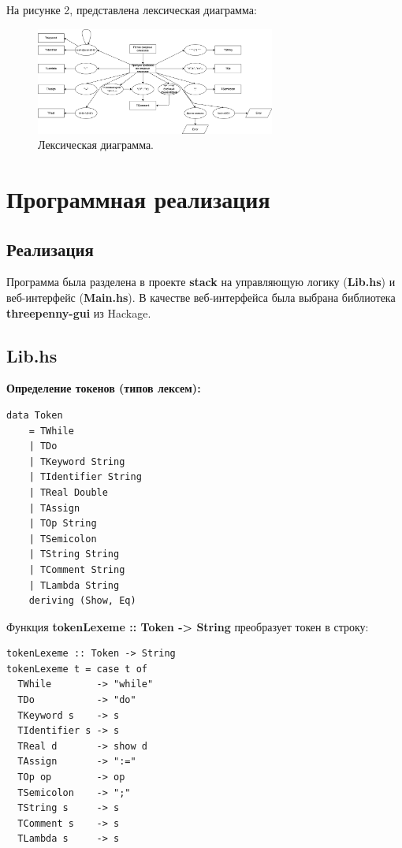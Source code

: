 \documentclass[areasetadvanced]{scrartcl}
\begin{document}
На рисунке 2, представлена лексическая диаграмма:
\begin{figure}[H]
        \centering
        \includegraphics[width=0.7\textwidth]{LexDiagram.png}
        \caption{Лексическая диаграмма.}
        \label{fig:syntdiag}
\end{figure}

\newpage

\section{Программная реализация}
\subsection{Реализация}

Программа была разделена в проекте \textbf{stack} на управляющую логику (\textbf{Lib.hs}) и веб-интерфейс (\textbf{Main.hs}). В качестве веб-интерфейса была выбрана библиотека \textbf{threepenny-gui} из Hackage.

\subsection{Lib.hs}
\textbf{Определение токенов (типов лексем):}
\begin{lstlisting}
data Token
    = TWhile
    | TDo
    | TKeyword String
    | TIdentifier String
    | TReal Double
    | TAssign
    | TOp String
    | TSemicolon
    | TString String
    | TComment String
    | TLambda String
    deriving (Show, Eq)
\end{lstlisting}

Функция \textbf{tokenLexeme :: Token -> String} преобразует токен в строку:
\begin{lstlisting}
tokenLexeme :: Token -> String
tokenLexeme t = case t of
  TWhile        -> "while"
  TDo           -> "do"
  TKeyword s    -> s
  TIdentifier s -> s
  TReal d       -> show d
  TAssign       -> ":="
  TOp op        -> op
  TSemicolon    -> ";"
  TString s     -> s
  TComment s    -> s
  TLambda s     -> s
\end{lstlisting}
\end{document}
